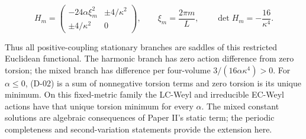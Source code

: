 \begin{equation}\tag{D-09}\label{eq:D-09}
H_m=\begin{pmatrix}-24\alpha\xi_m^2&\pm4/\kappa^2\\
\pm4/\kappa^2&0\end{pmatrix},\qquad
\xi_m=\frac{2\pi m}{L},\qquad\det H_m=-\frac{16}{\kappa^4}.
\end{equation}

Thus all positive-coupling stationary branches are saddles of this restricted
Euclidean functional. The harmonic branch has zero action difference from
zero torsion; the mixed branch has difference per four-volume
$3/(16\alpha\kappa^4)>0$. For $\alpha\le0$, (D-02) is a sum of nonnegative
torsion terms and zero torsion is its unique minimum. On this fixed-metric
family the LC-Weyl and irreducible EC-Weyl actions have that unique torsion
minimum for every $\alpha$. The mixed constant solutions are algebraic
consequences of Paper II's static term; the periodic completeness and
second-variation statements provide the extension here.
